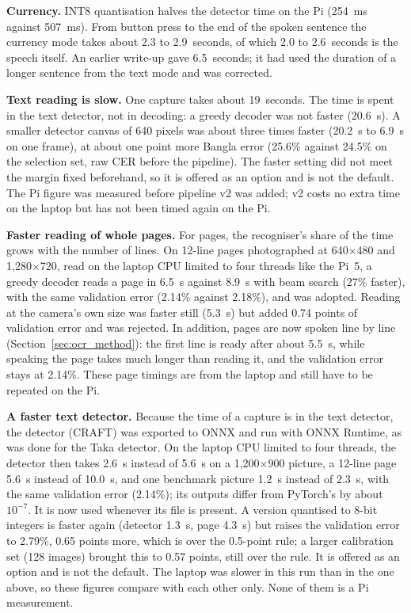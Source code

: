 \textbf{Currency.} INT8 quantisation halves the detector time on the Pi (254~ms against 507~ms). From button press to the end of the spoken sentence the currency mode takes about 2.3 to 2.9~seconds, of which 2.0 to 2.6~seconds is the speech itself. An earlier write-up gave 6.5~seconds; it had used the duration of a longer sentence from the text mode and was corrected.

\textbf{Text reading is slow.} One capture takes about 19~seconds. The time is spent in the text detector, not in decoding: a greedy decoder was not faster (20.6~s). A smaller detector canvas of 640 pixels was about three times faster (20.2~s to 6.9~s on one frame), at about one point more Bangla error (25.6\% against 24.5\% on the selection set, raw CER before the pipeline). The faster setting did not meet the margin fixed beforehand, so it is offered as an option and is not the default. The Pi figure was measured before pipeline v2 was added; v2 costs no extra time on the laptop but has not been timed again on the Pi.

\textbf{Faster reading of whole pages.} For pages, the recogniser's share of the time grows with the number of lines. On 12-line pages photographed at 640$\times$480 and 1,280$\times$720, read on the laptop CPU limited to four threads like the Pi~5, a greedy decoder reads a page in 6.5~s against 8.9~s with beam search (27\% faster), with the same validation error (2.14\% against 2.18\%), and was adopted. Reading at the camera's own size was faster still (5.3~s) but added 0.74 points of validation error and was rejected. In addition, pages are now spoken line by line (Section~\ref{sec:ocr_method}): the first line is ready after about 5.5~s, while speaking the page takes much longer than reading it, and the validation error stays at 2.14\%. These page timings are from the laptop and still have to be repeated on the Pi.

\textbf{A faster text detector.} Because the time of a capture is in the text detector, the detector (CRAFT) was exported to ONNX and run with ONNX Runtime, as was done for the Taka detector. On the laptop CPU limited to four threads, the detector then takes 2.6~s instead of 5.6~s on a 1,200$\times$900 picture, a 12-line page 5.6~s instead of 10.0~s, and one benchmark picture 1.2~s instead of 2.3~s, with the same validation error (2.14\%); its outputs differ from PyTorch's by about $10^{-7}$. It is now used whenever its file is present. A version quantised to 8-bit integers is faster again (detector 1.3~s, page 4.3~s) but raises the validation error to 2.79\%, 0.65 points more, which is over the 0.5-point rule; a larger calibration set (128 images) brought this to 0.57 points, still over the rule. It is offered as an option and is not the default. The laptop was slower in this run than in the one above, so these figures compare with each other only. None of them is a Pi measurement.

